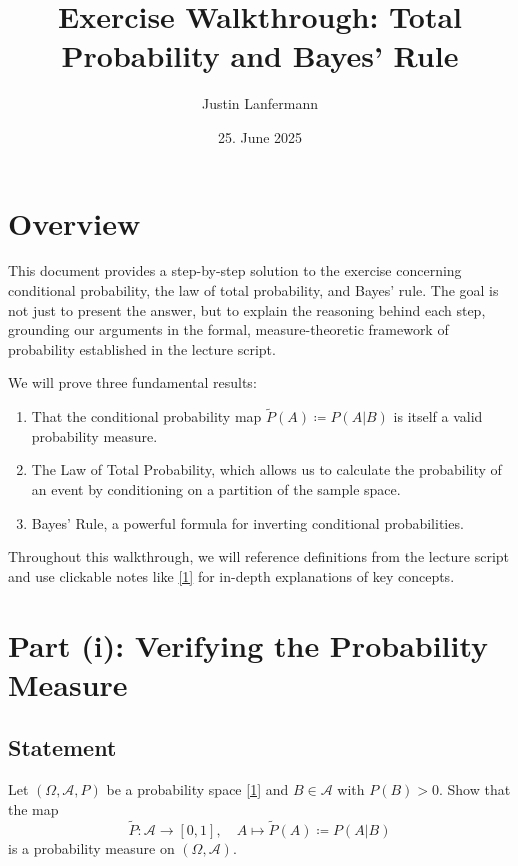 \documentclass[11pt,a4paper]{article}
\title{Exercise Walkthrough: Total Probability and Bayes' Rule}
\author{Justin Lanfermann}
\date{25. June 2025}
\begin{document}
\maketitle

\section{Overview}

This document provides a step-by-step solution to the exercise concerning conditional probability, the law of total probability, and Bayes' rule. The goal is not just to present the answer, but to explain the reasoning behind each step, grounding our arguments in the formal, measure-theoretic framework of probability established in the lecture script.

We will prove three fundamental results:
\begin{enumerate}
    \item That the conditional probability map \(\tilde{P}(A) \coloneqq P(A|B)\) is itself a valid probability measure.
    \item The Law of Total Probability, which allows us to calculate the probability of an event by conditioning on a partition of the sample space.
    \item Bayes' Rule, a powerful formula for inverting conditional probabilities.
\end{enumerate}
Throughout this walkthrough, we will reference definitions from the lecture script and use clickable notes like \hyperlink{note1}{[1]} for in-depth explanations of key concepts.

\section{Part (i): Verifying the Probability Measure}

\subsection*{Statement}
Let \((\Omega, \mathcal{A}, P)\) be a probability space \hyperlink{note1}{[1]} and \(B \in \mathcal{A}\) with \(P(B) > 0\). Show that the map
\[ \tilde{P} : \mathcal{A} \to [0, 1], \quad A \mapsto \tilde{P}(A) \coloneqq P(A | B) \]
is a probability measure on \((\Omega, \mathcal{A})\).
\end{document}
